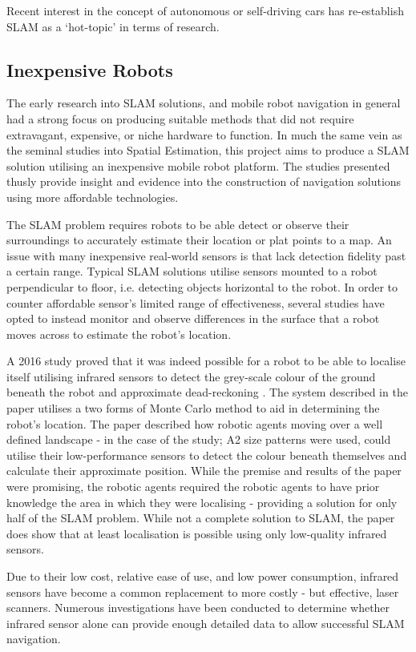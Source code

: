 Recent interest in the concept of autonomous or self-driving cars has
re-establish SLAM as a `hot-topic' in terms of research.


\subsection{Inexpensive Robots}
The early research into SLAM solutions, and mobile robot navigation in general
had a strong focus on producing suitable methods that did not require
extravagant, expensive, or niche hardware to function.
In much the same vein as the seminal studies into Spatial Estimation, this
project aims to produce a SLAM solution utilising an inexpensive mobile
robot platform.
The studies presented thusly provide insight and evidence into the
construction of navigation solutions using more affordable technologies.

The SLAM problem requires robots to be able detect or observe their
surroundings to accurately estimate their location or plat points to a map.
An issue with many inexpensive real-world sensors is that lack detection
fidelity past a certain range.
Typical SLAM solutions utilise sensors mounted to a robot perpendicular to
floor, i.e. detecting objects horizontal to the robot.
In order to counter affordable sensor's limited range of effectiveness, several
studies have opted to instead monitor and observe differences in the surface
that a robot moves across to estimate the robot's location.

A 2016 study proved that it was indeed possible for a robot to be able to
localise itself utilising infrared sensors to detect the grey-scale colour of
the ground beneath the robot and approximate dead-reckoning \cite{Wang2016}.
The system described in the paper utilises a two forms of  Monte Carlo
method to aid in determining the robot's location.
The paper described how robotic agents moving over a well defined landscape -
in the case of the study; A2 size patterns were used, could utilise
their low-performance sensors to detect the colour beneath themselves and
calculate their approximate position.
While the premise and results of the paper were promising, the robotic agents
required the robotic agents to have prior knowledge the area in which they
were localising - providing a solution for only half of the SLAM problem.
While not a complete solution to SLAM, the paper does show that at least
localisation is possible using only low-quality infrared sensors.

Due to their low cost, relative ease of use, and low power consumption,
infrared sensors have become a common replacement to more costly - but
effective, laser scanners.
Numerous investigations have been conducted to determine whether infrared
sensor alone can provide enough detailed data to allow successful SLAM
navigation.

